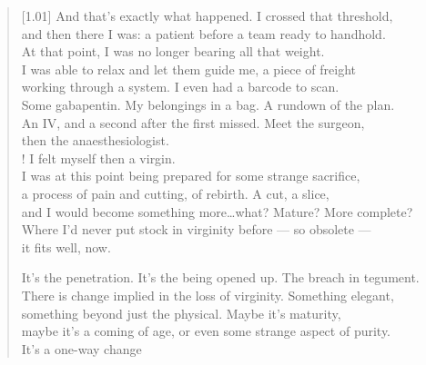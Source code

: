 \begin{verse}[1.01\textwidth]
  And that's exactly what happened. I crossed that threshold,\\
  and then there I was: a patient before a team ready to handhold.\\
  At that point, I was no longer bearing all that weight.\\
  I was able to relax and let them guide me, a piece of freight\\
  working through a system. I even had a barcode to scan.\\
  Some gabapentin. My belongings in a bag. A rundown of the plan.\\
  An IV, and a second after the first missed. Meet the surgeon,\\
  then the anaesthesiologist.\\!
   I felt myself then a virgin.\\
  I was at this point being prepared for some strange sacrifice,\\
  a process of pain and cutting, of rebirth. A cut, a slice,\\
  and I would become something more\ldots{}what? Mature? More complete?\\
  Where I'd never put stock in virginity before --- so obsolete ---\\
  it fits well, now.

  \begin{ally}
    \noindent It's the penetration. It's the being opened up. The breach in tegument.\\
  \noindent There is change implied in the loss of virginity. Something elegant,\\
  \noindent something beyond just the physical. Maybe it's maturity,\\
  \noindent maybe it's a coming of age, or even some strange aspect of purity.\\
  \noindent It's a one-way change
\end{ally}


\end{verse}
